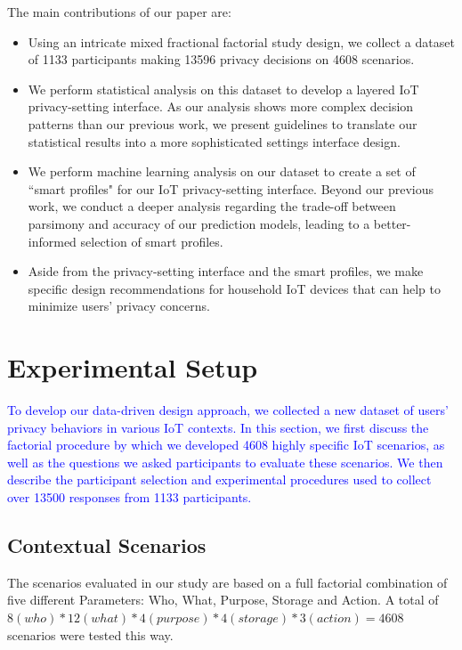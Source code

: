 The main contributions of our paper are:
\begin{itemize}
	\item Using an intricate mixed fractional factorial study design, we collect a dataset of 1133 participants making 13596 privacy decisions on 4608 scenarios.
	\item We perform statistical analysis on this dataset to develop a layered IoT privacy-setting interface. As our analysis shows more complex decision patterns than our previous work, we present guidelines to translate our statistical results into a more sophisticated settings interface design.
	\item We perform machine learning analysis on our dataset to create a set of ``smart profiles" for our IoT privacy-setting interface. Beyond our previous work, we conduct a deeper analysis regarding the trade-off between parsimony and accuracy of our prediction models, leading to a better-informed selection of smart profiles.
	\item Aside from the privacy-setting interface and the smart profiles, we make specific design recommendations for household IoT devices that can help to minimize users' privacy concerns. 
\end{itemize}

\section{Experimental Setup}\label{sec:exp_setup}
\textcolor{blue}{To develop our data-driven design approach, we collected a new dataset of users' privacy behaviors in various IoT contexts. In this section, we first discuss the factorial procedure by which we developed 4608 highly specific IoT scenarios, as well as the questions we asked participants to evaluate these scenarios. We then describe the participant selection and experimental procedures used to collect over 13500 responses from 1133 participants.}

\subsection{Contextual Scenarios}
The scenarios evaluated in our study are based on a full factorial combination of five different Parameters: Who, What, Purpose, Storage and Action. A total of $8(who)*12(what)*4(purpose)*4(storage)*3(action) = 4608$ scenarios were tested this way. 

